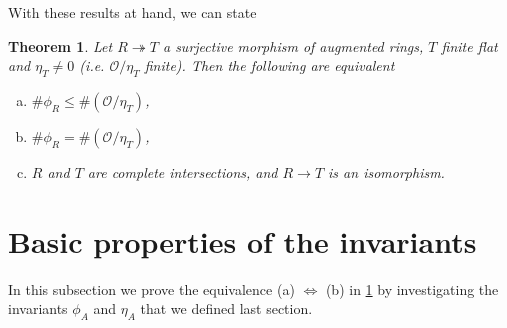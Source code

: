 \documentclass{article}
\theoremstyle{plain}%
\newtheorem{theorem}{Theorem}[section]
\theoremstyle{definition}
\theoremstyle{remark}
\begin{document}
With these results at hand, we can state 
\begin{theorem}\textup{\cite[theorem 5.3]{darmon1995fermat}}\label{thm:wiles_numerical_criterion}
    Let \(R \twoheadrightarrow T\) a surjective morphism of augmented rings, \(T\) finite flat and \(\eta_T \neq 0\) 
    (i.e. \(\mathcal{O}/\eta_T\) finite).
    Then the following are equivalent
    \begin{enumerate}[(a)]
        \item \(\# \phi_R \le \#(\mathcal{O}/\eta_T)\),
        \item \(\# \phi_R = \#(\mathcal{O}/\eta_T)\),
        \item \(R\) and \(T\) are complete intersections, and \(R \to T\) is an isomorphism.
    \end{enumerate}
\end{theorem}

\section{Basic properties of the invariants}
In this subsection we prove the equivalence (a) \(\Leftrightarrow\) (b) in \cref{thm:wiles_numerical_criterion}
by investigating the invariants \(\phi_A\) and \(\eta_A\) that we defined last section.
\end{document}
